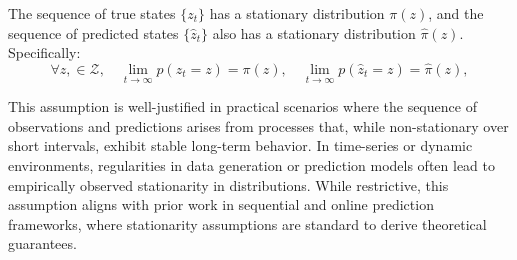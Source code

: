 \begin{assumption}\label{assump:stationary_distribution}
The sequence of true states \( \{z_t\} \) has a stationary distribution \( \pi(z) \), and the sequence of predicted states \( \{\hat{z}_t\} \) also has a stationary distribution \( \hat{\pi}(z) \). Specifically:
\[
\forall z, \in \mathcal{Z}, \quad \lim_{t \to \infty} p(z_t = z) = \pi(z), \quad \lim_{t \to \infty} p(\hat{z}_t = z) = \hat{\pi}(z),
\]
\end{assumption}


This assumption is well-justified in practical scenarios where the sequence of observations and predictions arises from processes that, while non-stationary over short intervals, exhibit stable long-term behavior. In time-series or dynamic environments, regularities in data generation or prediction models often lead to empirically observed stationarity in distributions. While restrictive, this assumption aligns with prior work in sequential and online prediction frameworks, where stationarity assumptions are standard to derive theoretical guarantees.

